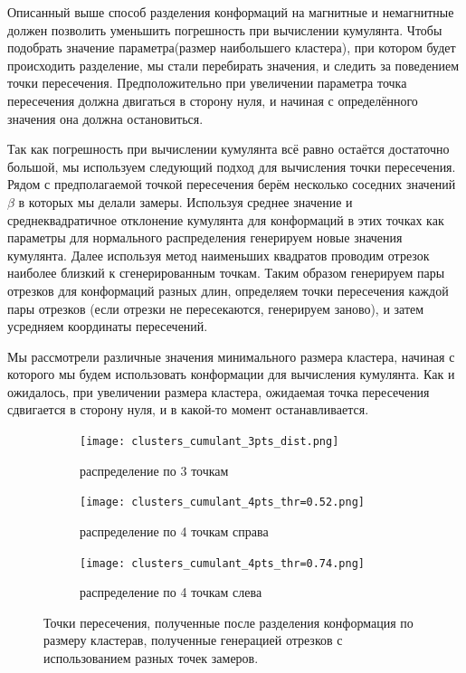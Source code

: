 Описанный выше способ разделения конформаций на магнитные и немагнитные должен позволить уменьшить погрешность при вычислении кумулянта. Чтобы подобрать значение параметра(размер наибольшего кластера), при котором будет происходить разделение, мы стали перебирать значения, и следить за поведением точки пересечения. Предположительно при увеличении параметра точка пересечения должна двигаться в сторону нуля, и начиная с определённого значения она должна остановиться.

Так как погрешность при вычислении кумулянта всё равно остаётся достаточно большой, мы используем следующий подход для вычисления точки пересечения. Рядом с предполагаемой точкой пересечения берём несколько соседних значений $\beta$ в которых мы делали замеры. Используя среднее значение и среднеквадратичное отклонение кумулянта для конформаций в этих точках как параметры для нормального распределения генерируем новые значения кумулянта. Далее используя метод наименьших квадратов проводим отрезок наиболее близкий к сгенерированным точкам. Таким образом генерируем пары отрезков для конформаций разных длин, определяем точки пересечения каждой пары отрезков (если отрезки не пересекаются, генерируем заново), и затем усредняем координаты пересечений.

Мы рассмотрели различные значения минимального размера кластера, начиная с которого мы будем использовать конформации для вычисления кумулянта. Как и ожидалось, при увеличении размера кластера, ожидаемая точка пересечения сдвигается в сторону нуля, и в какой-то момент останавливается.

\begin{figure}[ht]
	\centering
	\begin{subfigure}[t]{0.3\textwidth}
		\texttt{[image: clusters\_cumulant\_3pts\_dist.png]}
		\caption{распределение по 3 точкам}
	\end{subfigure}
	\begin{subfigure}[t]{0.3\textwidth}
		\texttt{[image: clusters\_cumulant\_4pts\_thr=0.52.png]}
		\caption{распределение по 4 точкам справа}
	\end{subfigure}
	\begin{subfigure}[t]{0.3\textwidth}
		\texttt{[image: clusters\_cumulant\_4pts\_thr=0.74.png]}
		\caption{распределение по 4 точкам слева}
	\end{subfigure}
	\caption{Точки пересечения, полученные после разделения конформация по размеру кластерав, полученные генерацией отрезков с использованием разных точек замеров.}
	\label{fig:ditrib_intersection}
\end{figure}

